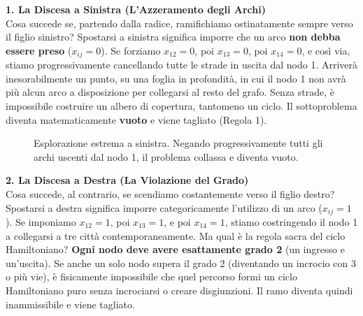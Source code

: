 \documentclass[12pt, a4paper]{article}
\begin{document}
	\textbf{1. La Discesa a Sinistra (L'Azzeramento degli Archi)}\\
	Cosa succede se, partendo dalla radice, ramifichiamo ostinatamente sempre verso il figlio sinistro?
	Spostarsi a sinistra significa imporre che un arco \textbf{non debba essere preso} ($x_{ij} = 0$). Se forziamo $x_{12} = 0$, poi $x_{13} = 0$, poi $x_{14} = 0$, e così via, stiamo progressivamente cancellando tutte le strade in uscita dal nodo 1.
	Arriverà inesorabilmente un punto, su una foglia in profondità, in cui il nodo 1 non avrà più alcun arco a disposizione per collegarsi al resto del grafo. Senza strade, è impossibile costruire un albero di copertura, tantomeno un ciclo. Il sottoproblema diventa matematicamente \textbf{vuoto} e viene tagliato (Regola 1).
	
	\begin{figure}[H]
		\centering
		\caption{Esplorazione estrema a sinistra. Negando progressivamente tutti gli archi uscenti dal nodo 1, il problema collassa e diventa vuoto.}
	\end{figure}
	
	\textbf{2. La Discesa a Destra (La Violazione del Grado)}\\
	Cosa succede, al contrario, se scendiamo costantemente verso il figlio destro?
	Spostarsi a destra significa imporre categoricamente l'utilizzo di un arco ($x_{ij} = 1$). Se imponiamo $x_{12} = 1$, poi $x_{13} = 1$, e poi $x_{14} = 1$, stiamo costringendo il nodo 1 a collegarsi a tre città contemporaneamente. 
	Ma qual è la regola sacra del ciclo Hamiltoniano? \textbf{Ogni nodo deve avere esattamente grado 2} (un ingresso e un'uscita). Se anche un solo nodo supera il grado 2 (diventando un incrocio con 3 o più vie), è fisicamente impossibile che quel percorso formi un ciclo Hamiltoniano puro senza incrociarsi o creare disgiunzioni. Il ramo diventa quindi inammissibile e viene tagliato.
	
\end{document}
